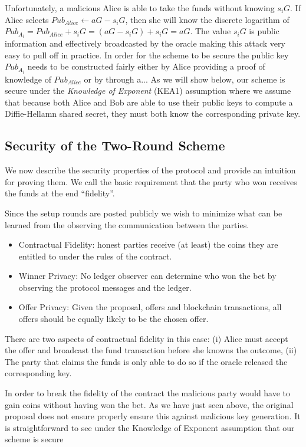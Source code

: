 \documentclass{article}
\theoremstyle{definition}
\begin{document}
Unfortunately, a malicious Alice is able to take the funds without knowing $s_iG$. If Alice selects $Pub_{Alice} \gets aG - s_iG$, then she will know the discrete logarithm of $Pub_{A_i} = Pub_{Alice} + s_iG = (aG - s_iG) + s_iG = aG$. The value $s_iG$ is public information and effectively broadcasted by the oracle making this attack very easy to pull off in practice. In order for the scheme to be secure the public key $Pub_{A_i}$ needs to be constructed fairly either by Alice providing a proof of knowledge of $Pub_{Alice}$ or by through a... As we will show below, our scheme is secure under the \emph{Knowledge of Exponent} (KEA1) assumption where we assume that because both Alice and Bob are able to use  their public keys to compute a Diffie-Hellamn shared secret, they must both know the corresponding private key.



\subsection{Security of the Two-Round Scheme}

We now describe the security properties of the protocol and provide an intuition for proving them. We call the basic requirement that the party who won receives the funds at the end ``fidelity''.

Since the setup rounds are posted publicly we wish to minimize what can be learned from the observing the communication between the parties.



\begin{itemize}
  \item Contractual Fidelity: honest parties receive (at least) the coins they are entitled to under the rules of the contract.
  \item Winner Privacy: No ledger observer can determine who won the bet by observing the protocol messages and the ledger.
  \item Offer Privacy: Given the proposal, offers and blockchain transactions, all offers should be equally likely to be the chosen offer.
\end{itemize}

  There are two aspects of contractual fidelity in this case: (i) Alice must accept the offer and broadcast the fund transaction before she knowns the outcome, (ii) The party that claims the funds is only able to do so if the oracle released the corresponding key.


  In order to break the fidelity of the contract the malicious party would have to gain coins without having won the bet. As we have just seen above, the original proposal does not ensure properly ensure this against malicious key generation. It is straightforward to see under the Knowledge of Exponent assumption that our scheme is secure
\end{document}
